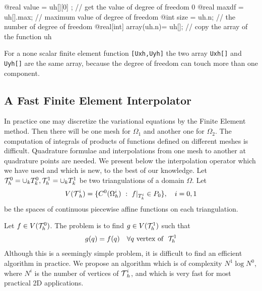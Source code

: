 \documentclass[a4paper,twoside,12pt]{book}
\def\setS#1{#1\label{sec:#1}}
\begin{document}

\bFF
   @real value = uh[][0] ; // get the value of degree of freedom 0
   @real maxdf = uh[].max; //  maximum value of degree of freedom
   @int size = uh.n; // the number of degree of freedom
   @real[int] array(uh.n)= uh[]; //  copy the array of the function uh
\eFF
\begin{note} For a none scalar finite element function   \texttt{[Uxh,Uyh]}
 the two array \texttt{Uxh[]} and  \texttt{Uyh[]} are the same array, because
 the degree of freedom can touch more than one component.
\end{note}

\subsection{A \setS{Fast Finite Element Interpolator}}
\medskip
In practice one may discretize the variational equations by the Finite Element method. Then
there will be one mesh for $\Omega_1$ and another one for $\Omega_2$.  The computation
of integrals of products of functions defined on different meshes is difficult.
Quadrature formulae and interpolations from one mesh to another at quadrature points are needed.
We present below the interpolation operator which we have used and which is new,
to the best of our knowledge.
\bigskip
Let ${\cal T}_{h}^0=\cup_k T^0_k,{\cal T}_{h}^1=\cup_k T^1_k$ be two triangulations of a domain $\Omega$.
Let
$$
V({\hbox{${\cal T}$}_{h}^i}) =\{ C^0(\Omega_h^i)~:~f|_{T^i_k}\in P_0\},~~~i=0,1
$$
be the spaces of continuous piecewise affine functions on each triangulation.

Let $f\in V({\cal T}_{h}^0)$. The problem is to find $g\in V({\cal T}_{h}^1)$ such that
$$
g(q) = f(q) \quad \forall q\hbox{~vertex of ~} {\cal T}_{h}^1
$$
Although this is a seemingly simple problem, it is difficult to find an
efficient algorithm in practice.
We propose an algorithm which is of complexity  $N^1\log N^0$, where $N^i$ is
the number of vertices of ${\hbox{${\cal T}$}_{h}^i}$, and which
is very fast for most practical 2D applications.
\bigskip
\end{document}

